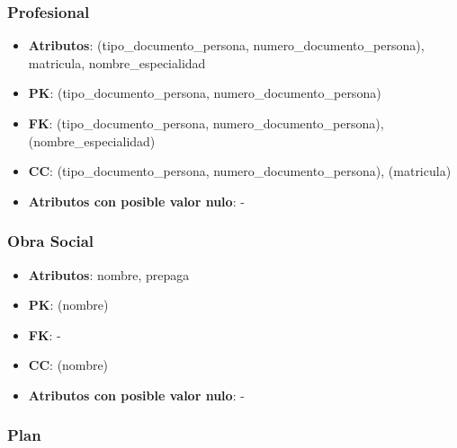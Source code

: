 \documentclass[a4paper,11pt]{article}
\begin{document}
\subsubsection{\textbf{Profesional}}

\begin{itemize}

\item 
\textbf{Atributos}: (tipo\_documento\_persona, numero\_documento\_persona), matricula,  nombre\_especialidad

\item 
\textbf{PK}: (tipo\_documento\_persona, numero\_documento\_persona)

\item
\textbf{FK}: (tipo\_documento\_persona, numero\_documento\_persona), (nombre\_especialidad)

\item 
\textbf{CC}: (tipo\_documento\_persona, numero\_documento\_persona), (matricula)

\item 
\textbf{Atributos con posible valor nulo}: -

\end{itemize}

\subsubsection{\textbf{Obra Social}}

\begin{itemize}

\item 
\textbf{Atributos}: nombre, prepaga

\item 
\textbf{PK}: (nombre)

\item
\textbf{FK}: -

\item 
\textbf{CC}: (nombre)

\item 
\textbf{Atributos con posible valor nulo}: -

\end{itemize}

\subsubsection{\textbf{Plan}}
\end{document}
